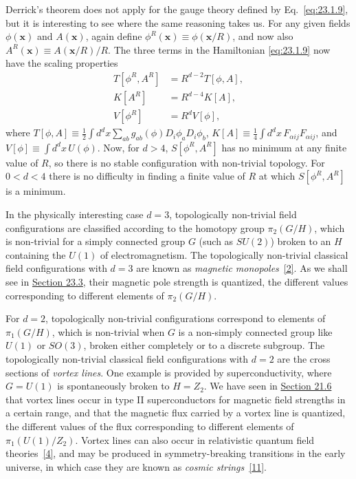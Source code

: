 Derrick's theorem does not apply for the gauge theory defined by
Eq.~\eqref{eq:23.1.9}, but it is interesting to see where the same reasoning
takes us. For any given fields $\phi(\mathbf{x})$ and $A(\mathbf{x})$,
again define $\phi^R(\mathbf{x})\equiv\phi(\mathbf{x}/R)$, and now also
$A^R(\mathbf{x})\equiv A(\mathbf{x}/R)/R$. The three terms in the
Hamiltonian \eqref{eq:23.1.9} now have the scaling properties
\[
 \begin{split}
  T[\phi^R,A^R]&=R^{d-2}T[\phi,A],\\
  K[A^R]&=R^{d-4}K[A],\\
  V[\phi^R]&=R^dV[\phi],
 \end{split}
\]
where
$T[\phi,A]\equiv\frac{1}{2}\int d^d x
\sum_{ab}g_{ab}(\phi)D_i\phi_aD_i\phi_b$,\newline
$K[A]\equiv\frac{1}{4}\int d^d x\,F_{\alpha ij}F_{\alpha ij}$, and
$V[\phi]\equiv\int d^d x\,U(\phi)$. Now, for $d>4$,
$S[\phi^R,A^R]$ has no minimum at any finite value of $R$, so there is no
stable configuration with non-trivial topology. For $0<d<4$ there is no
difficulty in finding a finite value of $R$ at which $S[\phi^R,A^R]$ is a
minimum.

In the physically interesting case $d=3$, topologically non-trivial field
configurations are classified according to the homotopy group
$\pi_2(G/H)$, which is non-trivial for a simply connected group $G$ (such
as $SU(2)$) broken to an $H$ containing the $U(1)$ of electromagnetism. The
topologically non-trivial classical field configurations with $d=3$ are
known as \emph{magnetic monopoles}~\hyperref[ch23-ref-2]{[2]}. As we shall
see in \hyperref[sec:23.3]{Section 23.3}, their magnetic pole strength is
quantized, the different values corresponding to different elements of
$\pi_2(G/H)$.

For $d=2$, topologically non-trivial configurations correspond to elements
of $\pi_1(G/H)$, which is non-trivial when $G$ is a non-simply connected
group like $U(1)$ or $SO(3)$, broken either completely or to a discrete
subgroup. The topologically non-trivial classical field configurations with
$d=2$ are the cross sections of \emph{vortex lines}. One example is
provided by superconductivity, where $G=U(1)$ is spontaneously broken to
$H=Z_2$. We have seen in \hyperref[sec:21.6]{Section 21.6} that vortex
lines occur in type II superconductors for magnetic field strengths in a
certain range, and that the magnetic flux carried by a vortex line is
quantized, the different values of the flux corresponding to different
elements of $\pi_1(U(1)/Z_2)$. Vortex lines can also occur in relativistic
quantum field theories~\hyperref[ch23-ref-4]{[4]}, and may be produced in
symmetry-breaking transitions in the early universe, in which case they are
known as \emph{cosmic strings}~\hyperref[ch23-ref-11]{[11]}.

